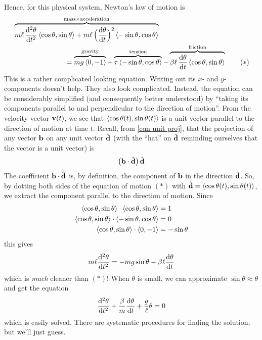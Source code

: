 Hence, for this physical system, Newton's law of motion is 
\begin{align}
&\overbrace{m\ell\,\ddiff{2}{\theta}{t}\llt \cos\theta,\sin\theta\rgt 
+m\ell\,\Big(\diff{\theta}{t}\Big)^2\llt -\sin\theta,\cos\theta\rgt}^
        {\text{mass}\times\text{acceleration}}
  \notag\\
&\hskip1in=
\overbrace{mg\llt 0,-1\rgt}^{\rm gravity} 
 +\overbrace{\tau \llt -\sin\theta,\cos\theta\rgt}^{\rm tension}
-\overbrace{\beta\ell\,\diff{\theta}{t}\llt \cos\theta,\sin\theta\rgt}^{\rm friction} 
\tag{$*$}
\end{align}
This is a rather complicated looking equation. Writing out its $x$- and
$y$-components doesn't help. They also look complicated.
Instead, the equation can be considerably simplified (and 
consequently better understood) by ``taking its components parallel to
and perpendicular to the direction of motion''. From the velocity vector
$\mathbf{v}(t)$, we see that $\left< \cos\theta(t),\sin\theta(t)\right> $ is a unit 
vector parallel to the direction of motion at time $t$.
Recall, from \eqref{eqn unit proj}, that the projection of any vector 
$\mathbf{b}$ on any unit vector $\hat{\mathbf{d}}$ 
(with the ``hat'' on $\hat{\mathbf{d}}$ reminding ourselves that the vector is a unit
vector) is
\begin{align*}
\big(\mathbf{b}\cdot \hat{\mathbf{d}}\big)\,\hat{\mathbf{d}}
\end{align*}
The coefficient $\mathbf{b}\cdot \hat{\mathbf{d}}$ is, by definition, the
component of $\mathbf{b}$ in the direction $\hat{\mathbf{d}}$.
So, by dotting both sides of the equation of motion $(*)$ with
$\hat{\mathbf{d}}=\left< \cos\theta(t),\sin\theta(t)\right> $, we extract the component 
parallel to the direction of motion. Since
\begin{align*}
\left< \cos\theta,\sin\theta\right> \cdot\left< \cos\theta,\sin\theta\right> &=1\\
\left< \cos\theta,\sin\theta\right> \cdot\left< -\sin\theta,\cos\theta\right> &=0\\
\left< \cos\theta,\sin\theta\right> \cdot\left< 0,-1\right> &=-\sin\theta
\end{align*}
this gives
\begin{align*} 
m\ell\ddiff{2}{\theta}{t}=-mg\sin\theta-\beta\ell\diff{\theta}{t}
\end{align*}
which is \emph{much} cleaner than $(*)$!
When $\theta$ is small, we can approximate $\sin\theta\approx\theta$ 
and get the equation
\begin{align*}
\ddiff{2}{\theta}{t}+\frac{\beta}{m}\diff{\theta}{t}+\frac{g}{\ell}\theta=0
\end{align*}
which is easily solved. There are systematic procedures for finding 
the solution, but we'll just guess. 

